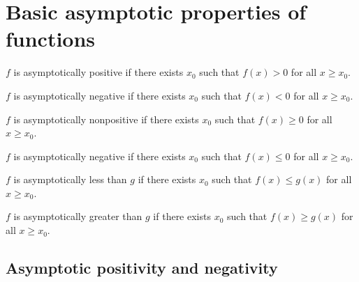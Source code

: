 
\chapter{Basic asymptotic properties of functions}

\begin{definition}
    \label{def:asymp_pos}
    \leanok
    $f$ is asymptotically positive if there exists $x_0$ such that $f(x) > 0$
    for all $x \ge x_0$.

\end{definition}

\begin{definition}
    \label{def:asymp_neg}
    \leanok
    $f$ is asymptotically negative if there exists $x_0$ such that $f(x) < 0$
    for all $x \ge x_0$.

\end{definition}

\begin{definition}
    \label{def:asymp_nonpos}
    \leanok
    $f$ is asymptotically nonpositive if there exists $x_0$ such that $f(x) \ge 0$
    for all $x \ge x_0$.

\end{definition}

\begin{definition}
    \label{def:asymp_nonneg}
    \leanok
    $f$ is asymptotically negative if there exists $x_0$ such that $f(x) \le 0$
    for all $x \ge x_0$.

\end{definition}

\begin{definition} 
    \label{def:asymp_le} 
    \leanok
    $f$ is asymptotically less than $g$ if there exists $x_0$ such that
    $f(x) \le g(x)$ for all $x \ge x_0$.

\end{definition}

\begin{definition}
    \label{def:asymp_ge}
    \leanok
    $f$ is asymptotically greater than $g$ if there exists $x_0$ such that
    $f(x) \ge g(x)$ for all $x \ge x_0$.

\end{definition}

\section{Asymptotic positivity and negativity}


